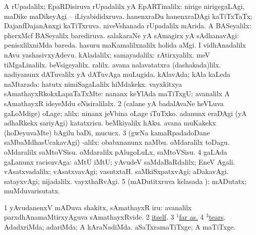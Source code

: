  A rUpadalilx; EpaRDisiruva rUpadalilx yA EpARTinalilx:  nirige nirigegaLAgi, maDike maDikeyAgi -- iLiyabididxruva.  hanenxraDu hanenxraDAgi kaTiTxTaTx; DajanfDajanAnxgi kaTiTxruva.  niveVshanada rUpadalilx mArida. 
 A BASeyalilx:  pherxMcf BASeyalilx barediruva. 
 salakaraNe yA sAmagirx yA sAdhanavAgi:  penisxlilxniMda bareda.  hasuru maKamalilxnalilx holida aMgi.  I vidhAnadalilx nAvu yashasivxyAdevu. 
 kAladalilx; samayadalilx:  rAtirxyalilx.  meV tiMgaLinalilx.  beVsigeyalilx. ralilx.  avana nalavatatxra (dashakada)lilx.  nadiyanunx dATuvalilx yA dATuvAga muLugida. 
 kAlavAda; kAla kaLeda naMtarada:  hatutx nimiSagaLalilx hiMdakekx. 
 vayxkitxya sAmathayxRkokxLapaTaTxMte:  nananx keYlAda maTiTxgU:  avanalilx A sAmathayxR ideyeMdu eNisiralilalx. 
\eanum
\numie
\num{2} (calane yA badalAvaNe heVLuva \kirx gaLoMdige) oLage; alilx:  ninanx jeVbina oLage iTuTxko.   adanunx eraDAgi (yA adhaRkekx sariyAgi) katatxrisu.  beMkiyalilx hAku.  avana muKakekx (hoDeyuvaMte) bAgilu baDi, mucucx. 
\num{3} (gwNa kamaRpadadoDane saMbaMdhasUcakavAgi) -alilx:  obabxnanunx naMbu.  oMdaralilx toDagu.  oMdaralilx saMtoVSisu.  oMdaralilx pAlugoLuLx, saMtoVSisu. 
\num{4} \kirxvi gaLAda \pagu gaLanunx racisuvAga:  aMtU iMtU; yAvudeV saMdaBaRdalilx; EneV Agali.  vAsatxvadalilx; vAsatxvavAgi; vasutxtaH.  saMkiSxpatxvAgi; aDakavAgi.  satayxvAgi; nijadalilx.  vayxthaRvAgi. 
\num{5} (mADutitxruva kelasada \vi):  mADutatx; muMduvarisutatx. 
\enum
\emng

\noindent
\gl{\pagu}
\bmng
{} 
\bnum
\num{1}  yAvudanenxV mADuva shakitx, sAmathayxR iru:  avanalilx parxdhAnamaMtirxyAguva sAmathayxRvide. 
\num{2}  \hyperlink{itself(2)}{itself}. 
\num{3}  \hyperref{kandict_f.pdf}{F}{far(1) pagu(5)}{$^1$far as.} 
\num{4}  \hyperref{kandict_t.pdf}{T}{tear(3) pagu(1)}{$^3$tears}. 
  
\banum
{} AdadxriMda; adariMda; A kAraNadiMda. 
 aSaTxramaTiTxge; A maTiTxge. 
\eanum
\numie
\enum
\emng

